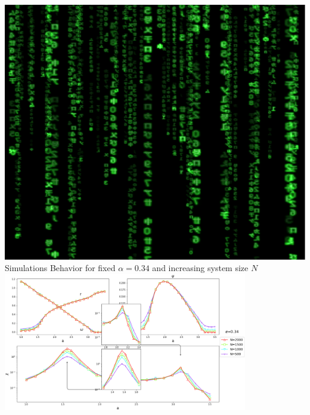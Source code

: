 \documentclass[serif,mathserif]{beamer}
\begin{document}
\begin{frame}{\includegraphics[height=0.06\textheight]{matrix.eps}\hspace{0.25cm} Simulations}
    \centering
    Behavior for fixed $\alpha=0.34$ and increasing system size $N$\\
    \vspace{0.25cm}
    \includegraphics[width=0.8\textwidth]{increasingN-alpha34.eps}
\end{frame}
\end{document}
